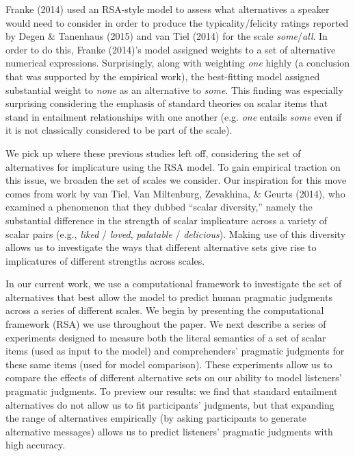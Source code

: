 \documentclass[10pt, letterpaper]{article}
\begin{document}
Franke (2014) used an RSA-style model to assess what alternatives a
speaker would need to consider in order to produce the
typicality/felicity ratings reported by Degen \& Tanenhaus (2015) and
{van Tiel} (2014) for the scale \emph{some}/\emph{all}. In order to do
this, Franke (2014)'s model assigned weights to a set of alternative
numerical expressions. Surprisingly, along with weighting \emph{one}
highly (a conclusion that was supported by the empirical work), the
best-fitting model assigned substantial weight to \emph{none} as an
alternative to \emph{some}. This finding was especially surprising
considering the emphasis of standard theories on scalar items that stand
in entailment relationships with one another (e.g. \emph{one} entails
\emph{some} even if it is not classically considered to be part of the
scale).

We pick up where these previous studies left off, considering the set of
alternatives for implicature using the RSA model. To gain empirical
traction on this issue, we broaden the set of scales we consider. Our
inspiration for this move comes from work by {van Tiel}, Van Miltenburg,
Zevakhina, \& Geurts (2014), who examined a phenomenon that they dubbed
``scalar diversity,'' namely the substantial difference in the strength
of scalar implicature across a variety of scalar pairs (e.g.,
\emph{liked} / \emph{loved}, \emph{palatable} / \emph{delicious}).
Making use of this diversity allows us to investigate the ways that
different alternative sets give rise to implicatures of different
strengths across scales.

In our current work, we use a computational framework to investigate the
set of alternatives that best allow the model to predict human pragmatic
judgments across a series of different scales. We begin by presenting
the computational framework (RSA) we use throughout the paper. We next
describe a series of experiments designed to measure both the literal
semantics of a set of scalar items (used as input to the model) and
comprehenders' pragmatic judgments for these same items (used for model
comparison). These experiments allow us to compare the effects of
different alternative sets on our ability to model listeners' pragmatic
judgments. To preview our results: we find that standard entailment
alternatives do not allow us to fit participants' judgments, but that
expanding the range of alternatives empirically (by asking participants
to generate alternative messages) allows us to predict listeners'
pragmatic judgments with high accuracy.
\end{document}
